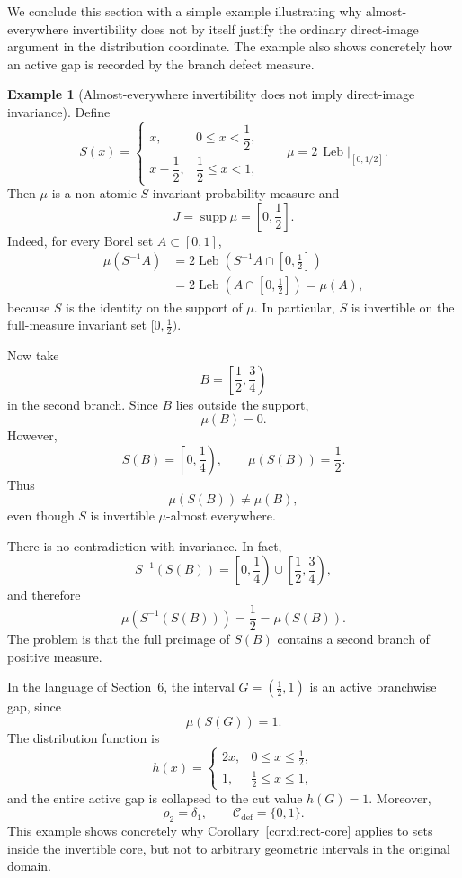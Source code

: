 \documentclass[11pt]{amsart}
\theoremstyle{plain}
\theoremstyle{definition}
\newtheorem{example}[theorem]{Example}
\theoremstyle{remark}
\DeclareMathOperator{\supp}{supp}
\DeclareMathOperator{\Leb}{Leb}
\newcommand{\cC}{\mathcal C}
\begin{document}
We conclude this section with a simple example illustrating why almost-everywhere
invertibility does not by itself justify the ordinary direct-image argument in the
distribution coordinate. The example also shows concretely how an active gap is recorded by
the branch defect measure.

\begin{example}[Almost-everywhere invertibility does not imply direct-image invariance]
\label{ex:direct-image-failure}
Define
\[
S(x)=
\begin{cases}
 x, & 0\le x<\dfrac12,\\[2mm]
 x-\dfrac12, & \dfrac12\le x<1,
\end{cases}
\qquad
\mu=2\,\Leb|_{[0,1/2]}.
\]
Then $\mu$ is a non-atomic $S$-invariant probability measure and
\[
J=\supp\mu=\left[0,\frac12\right].
\]
Indeed, for every Borel set $A\subset[0,1]$,
\[
\begin{aligned}
\mu(S^{-1}A)
&=2\Leb\left(S^{-1}A\cap\left[0,\frac12\right]\right)\\
&=2\Leb\left(A\cap\left[0,\frac12\right]\right)
=\mu(A),
\end{aligned}
\]
because $S$ is the identity on the support of $\mu$. In particular, $S$ is invertible on the
full-measure invariant set $[0,\frac12)$.

Now take
\[
B=\left[\frac12,\frac34\right)
\]
in the second branch. Since $B$ lies outside the support,
\[
\mu(B)=0.
\]
However,
\[
S(B)=\left[0,\frac14\right),
\qquad
\mu(S(B))=\frac12.
\]
Thus
\[
\mu(S(B))\ne\mu(B),
\]
even though $S$ is invertible $\mu$-almost everywhere.

There is no contradiction with invariance. In fact,
\[
S^{-1}(S(B))
=
\left[0,\frac14\right)
\cup
\left[\frac12,\frac34\right),
\]
and therefore
\[
\mu(S^{-1}(S(B)))=\frac12=\mu(S(B)).
\]
The problem is that the full preimage of $S(B)$ contains a second branch of positive measure.

In the language of Section~6, the interval $G=(\frac12,1)$ is an active branchwise gap,
since
\[
\mu(S(G))=1.
\]
The distribution function is
\[
h(x)=
\begin{cases}
2x, & 0\le x\le\frac12,\\
1, & \frac12\le x\le1,
\end{cases}
\]
and the entire active gap is collapsed to the cut value $h(G)=1$. Moreover,
\[
\rho_2=\delta_1,
\qquad
\cC_{\mathrm{def}}=\{0,1\}.
\]
This example shows concretely why Corollary~\ref{cor:direct-core} applies to sets inside
the invertible core, but not to arbitrary geometric intervals in the original domain.
\end{example}
\end{document}
